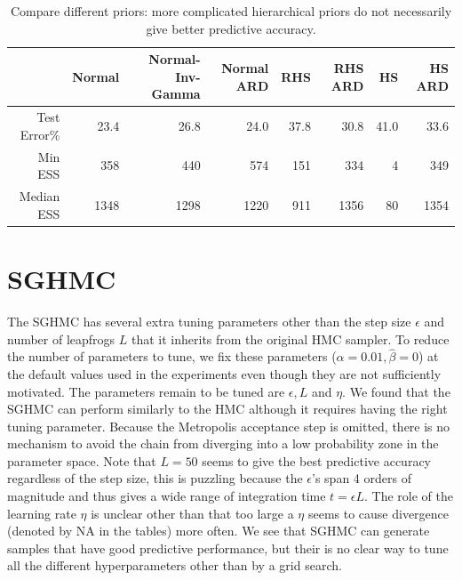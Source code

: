 \documentclass[12pt]{report}
\begin{document}
\begin{table}[]
\centering
\begin{tabular}{@{}rrrrrrrr@{}}
\toprule
              & Normal & Normal-Inv-Gamma & Normal ARD     & RHS     & RHS ARD & HS  & HS ARD \\ \midrule
Test Error$\%$    & 23.4    & 26.8    & 24.0& 37.8    & 30.8      & 41.0       & 33.6               \\ \midrule
Min ESS       & 358      & 440   & 574  & 151  & 334     & 4       & 349              \\ \midrule
Median ESS    & 1348      & 1298  & 1220  & 911 & 1356     & 80      & 1354             \\ \midrule
\end{tabular}
\caption{Compare different priors: more complicated hierarchical priors do not necessarily give better predictive accuracy.}
\label{my-label}
\end{table}

\section{SGHMC}
The SGHMC has several extra tuning parameters other than the step size $\epsilon$ and number of leapfrogs $L$ that it inherits from the original HMC sampler. To reduce the number of parameters to tune, we fix these parameters ($\alpha=0.01, \hat{\beta}=0$) at the default values used in the experiments even though they are not sufficiently motivated. The parameters remain to be tuned are $\epsilon,L $ and $\eta$. We found that the SGHMC can perform similarly to the HMC although it requires having the right tuning parameter. Because the Metropolis acceptance step is omitted, there is no mechanism to avoid the chain from diverging into a low probability zone in the parameter space. Note that $L=50$ seems to give the best predictive accuracy regardless of the step size, this is puzzling because the $\epsilon$'s span 4 orders of magnitude and thus gives a wide range of integration time $t = \epsilon L$. The role of the learning rate $\eta$ is unclear other than that too large a $\eta$ seems to cause divergence (denoted by NA in the tables) more often. We see that SGHMC can generate samples that have good predictive performance, but their is no clear way to tune all the different hyperparameters other than by a grid search. 
\end{document}
